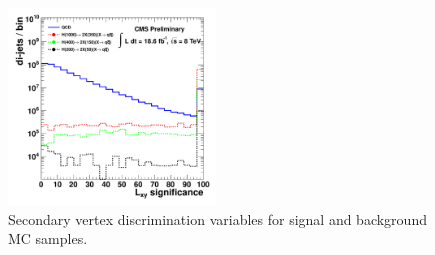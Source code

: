 \begin{enumerate}
\begin{figure}
\includegraphics[width=0.49\textwidth]{plots/discrimination/disc_lxysig.pdf}
\caption{Secondary vertex discrimination variables for signal and background MC samples.\label{fig:discvtx}}

\end{figure}


\end{enumerate}
